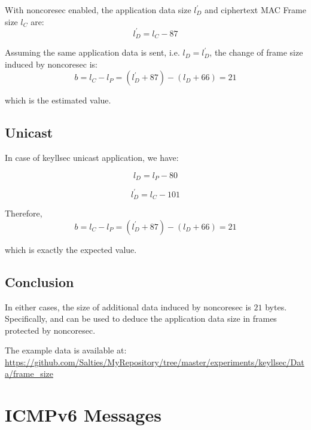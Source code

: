 With noncoresec enabled, the application data size $l^{\prime}_D$ and ciphertext MAC Frame size $l_C$ are:
\begin{equation} \label{Eq: broadcast llsec data size}
	l^{\prime}_D = l_{C} - 87
\end{equation}

Assuming the same application data is sent, i.e. $l_D = l^{\prime}_D$, the change of frame size induced by noncoresec is:
\begin{equation}
	b = l_C - l_P = (l^{\prime}_D + 87) - (l_D + 66) = 21
\end{equation}

which is the estimated value.

\subsection{Unicast}

In case of keyllsec unicast application, we have:

\begin{equation}
	l_D= l_P - 80
\end{equation}

\begin{equation} \label{Eq: unicast llsec data size}
	l^{\prime}_D = l_{C} - 101 
\end{equation}

Therefore, 
\begin{equation}
	b = l_C - l_P = (l^{\prime}_D + 87) - (l_D + 66) = 21
\end{equation}

which is exactly the expected value.

\subsection{Conclusion}

In either cases, the size of additional data induced by noncoresec is $21$ bytes. Specifically,  and  can be used to deduce the application data size in frames protected by noncoresec.

The example data is available at: \\
\url{https://github.com/Salties/MyRepository/tree/master/experiments/keyllsec/Data/frame_size}


\section{ICMPv6 Messages}

